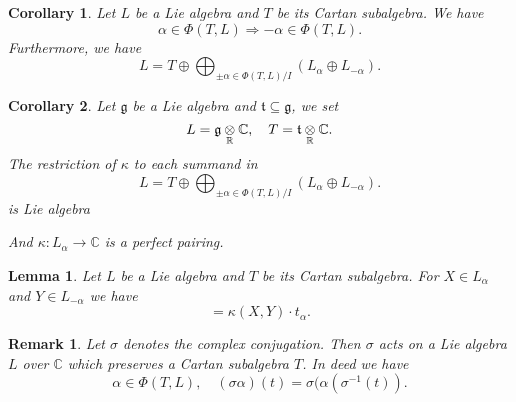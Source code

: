 \documentclass{article}
\newtheorem{lemma}{Lemma}[section]
\newtheorem{remark}{Remark}[section]
\newtheorem{corollary}{Corollary}[section]
\numberwithin{equation}{section}
\newcommand{\tens}[1]{%
  \mathbin{\mathop{\otimes}\displaylimits_{#1}}%
}
\begin{document}
\begin{corollary}
Let $L$ be a Lie algebra and $T$ be its Cartan subalgebra. We have
\begin{equation*}
\alpha\in\Phi(T,L)\Rightarrow -\alpha\in\Phi(T,L).
\end{equation*}
Furthermore, we have
\begin{equation*}
L = T\oplus\bigoplus_{\pm\alpha\in \Phi(T,L)/I} (L_\alpha\oplus L_{-\alpha}).
\end{equation*}
\end{corollary}

\begin{corollary}
Let $\mathfrak{g}$ be a Lie algebra and $\mathfrak{t}\subseteq \mathfrak{g}$, we set
\begin{equation*}
L = \mathfrak{g}\tens{\mathbb{R}}\mathbb{C}, \quad T = \mathfrak{t}\tens{\mathbb{R}}\mathbb{C}.
\end{equation*}
The restriction of $\kappa$ to each summand in
\begin{equation*}
L = T\oplus\bigoplus_{\pm\alpha\in \Phi(T,L)/I} (L_\alpha\oplus L_{-\alpha}).
\end{equation*}
is Lie algebra%
\\
\par And $\kappa:L_\alpha\to\mathbb{C}$ is a perfect pairing.
\end{corollary}

\begin{lemma}
Let $L$ be a Lie algebra and $T$ be its Cartan subalgebra. For $X\in L_\alpha$ and $Y\in L_{-\alpha}$ we have
\begin{equation*}
[X,Y] = \kappa(X,Y)\cdot t_{\alpha}.
\end{equation*}
\end{lemma}

\begin{remark}
Let $\sigma$ denotes the complex conjugation. Then $\sigma$ acts on a Lie algebra $L$ over $\mathbb{C}$ which preserves a Cartan subalgebra $T$. In deed we have
\begin{equation*}
\alpha\in\Phi(T,L),\quad (\sigma\alpha)(t) = \sigma(\alpha(\sigma^{-1}(t)).
\end{equation*}
\end{remark}
\end{document}
